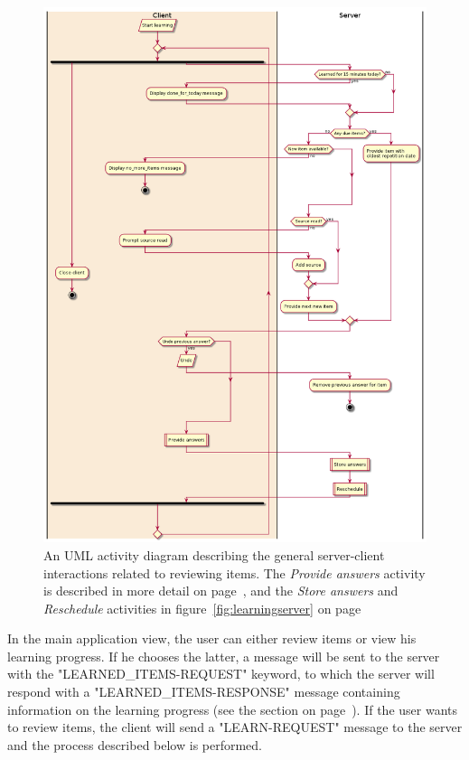 \begin{figure}
\centering
\includegraphics[width=.9\textwidth]{img/learningactivitygen.png}
    \caption{An UML activity diagram describing the general server-client interactions related to reviewing items. The \protect\emph{Provide answers} activity is described in more detail on page~\protect\pageref{sec:client_learning}, and the \protect\emph{Store answers} and \protect\emph{Reschedule} activities in figure~\protect\ref{fig:learningserver} on page~\protect\pageref{fig:learningserver}}
\label{fig:learningactivitygen}
\end{figure}

In the main application view, the user can either review items or view his learning progress. If he chooses the latter, a message will be sent to the server with the "LEARNED\_ITEMS-REQUEST" keyword, to which the server will respond with a "LEARNED\_ITEMS-RESPONSE" message containing information on the learning progress (see the  section on page~\pageref{sec:learningprogress}). If the user wants to review items, the client will send a "LEARN-REQUEST" message to the server and the process described below is performed.

